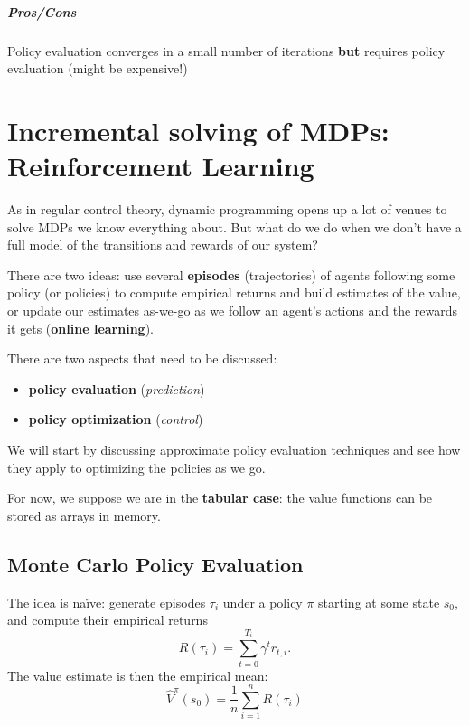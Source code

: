 \documentclass[../course-notes.tex]{subfiles}
\begin{document}
\paragraph{{\bluefont Pros}/{\redfont Cons}} Policy evaluation converges in a small number of iterations \textbf{but} requires policy evaluation (might be expensive!)




\chapter{Incremental solving of MDPs: Reinforcement Learning}\label{chap:incrRL}

As in regular control theory, dynamic programming opens up a lot of venues to solve MDPs we know everything about. But what do we do when we don't have a full model of the transitions and rewards of our system?

There are two ideas: use several \textbf{\bluefont episodes} (trajectories) of agents following some policy (or policies) to compute empirical returns and build estimates of the value, or update our estimates as-we-go as we follow an agent's actions and the rewards it gets (\textbf{\bluefont online learning}).


There are two aspects that need to be discussed:
\begin{itemize}
	\item \textbf{policy evaluation} (\textit{prediction})
	\item \textbf{policy optimization} (\textit{control})
\end{itemize}


We will start by discussing approximate policy evaluation techniques and see how they apply to optimizing the policies as we go.

For now, we suppose we are in the \textbf{tabular case}: the value functions can be stored as arrays in memory.


\section{Monte Carlo Policy Evaluation}

The idea is naïve: generate episodes $\tau_i$ under a policy $\pi$ starting at some state $s_0$, and compute their empirical returns
\[
	R(\tau_i) = \sum_{t=0}^{T_i} \gamma^t r_{t,i}.
\]
The value estimate is then the empirical mean:
\begin{equation}
	\widehat{V}^\pi(s_0) = \frac{1}{n}\sum_{i=1}^{n} R(\tau_i)
\end{equation}
\end{document}
